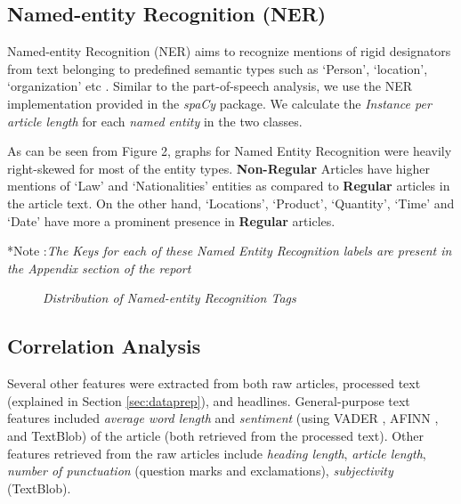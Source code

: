 \documentclass[11pt]{article}
\begin{document}
\subsection{Named-entity Recognition (NER)}
Named-entity Recognition (NER) aims to recognize mentions of rigid designators from text belonging to predefined semantic types such as `Person', `location', `organization' etc \cite{nadeau2007survey}. Similar to the part-of-speech analysis, we use the NER implementation provided in the \textit{spaCy} package. We calculate the \textit{Instance per article length} for each \textit{named entity} in the two classes.

As can be seen from Figure 2, graphs for Named Entity Recognition were heavily right-skewed for most of the entity types. \textbf{Non-Regular} Articles have  higher mentions of `Law' and `Nationalities' entities as compared to \textbf{Regular} articles in the article text. On the other hand, `Locations', `Product', `Quantity', `Time' and `Date'  have more a prominent presence in \textbf{Regular} articles.

\medskip

*Note :\textit{The Keys for each of these Named Entity Recognition labels are present in the Appendix section of the report}

\begin{figure}[!htb]
\caption{\label{fig:ner} \textit{Distribution of Named-entity Recognition Tags}}
\end{figure}

\subsection{Correlation Analysis}

Several other features were extracted from both raw articles, processed text (explained in Section \ref{sec:dataprep}), and headlines. General-purpose text features included \textit{average word length} and \textit{sentiment} (using VADER \cite{hutto2014vader}, AFINN \cite{nielsen2011afinn}, and TextBlob) of the article (both retrieved from the processed text). Other features retrieved from the raw articles include \textit{heading length}, \textit{article length}, \textit{number of punctuation} (question marks and exclamations), \textit{subjectivity} (TextBlob).
\end{document}
